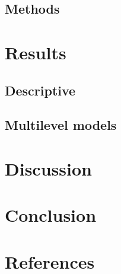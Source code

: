\documentclass[
  12pt,
]{article}
\begin{document}
\subsection{Methods}\label{methods}

\section{Results}\label{results}

\subsection{Descriptive}\label{descriptive}

\subsection{Multilevel models}\label{multilevel-models}

\section{Discussion}\label{discussion}

\section{Conclusion}\label{conclusion}

\section{References}\label{references}

\label{refs}
\end{document}
